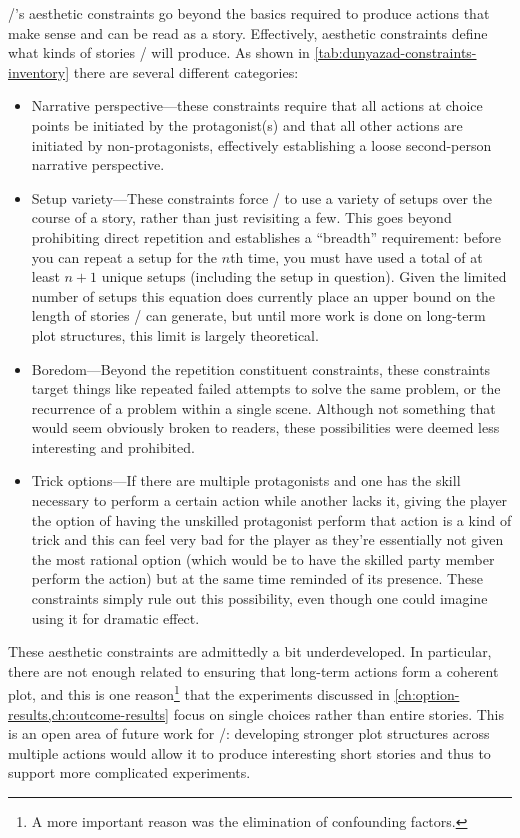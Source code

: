 \dunyazad/'s aesthetic constraints go beyond the basics required to produce actions that make sense and can be read as a story.
%
Effectively, aesthetic constraints define what kinds of stories \dunyazad/ will produce.
%
As shown in \cref{tab:dunyazad-constraints-inventory} there are several different categories:
%
\begin{itemize}
  \item Narrative perspective---these constraints require that all actions at choice points be initiated by the protagonist(s) and that all other actions are initiated by non-protagonists, effectively establishing a loose second-person narrative perspective.
  \item Setup variety---These constraints force \dunyazad/ to use a variety of setups over the course of a story, rather than just revisiting a few. This goes beyond prohibiting direct repetition and establishes a ``breadth'' requirement: before you can repeat a setup for the $n$th time, you must have used a total of at least $n+1$ unique setups (including the setup in question). Given the limited number of setups this equation does currently place an upper bound on the length of stories \dunyazad/ can generate, but until more work is done on long-term plot structures, this limit is largely theoretical.
  \item Boredom---Beyond the repetition constituent constraints, these constraints target things like repeated failed attempts to solve the same problem, or the recurrence of a problem within a single scene. Although not something that would seem obviously broken to readers, these possibilities were deemed less interesting and prohibited.
  \item Trick options---If there are multiple protagonists and one has the skill necessary to perform a certain action while another lacks it, giving the player the option of having the unskilled protagonist perform that action is a kind of trick and this can feel very bad for the player as they're essentially not given the most rational option (which would be to have the skilled party member perform the action) but at the same time reminded of its presence. These constraints simply rule out this possibility, even though one could imagine using it for dramatic effect.
\end{itemize}


These aesthetic constraints are admittedly a bit underdeveloped.
%
In particular, there are not enough related to ensuring that long-term actions form a coherent plot, and this is one reason\footnote{A more important reason was the elimination of confounding factors.} that the experiments discussed in \cref{ch:option-results,ch:outcome-results} focus on single choices rather than entire stories.
%
This is an open area of future work for \dunyazad/: developing stronger plot structures across multiple actions would allow it to produce interesting short stories and thus to support more complicated experiments.

